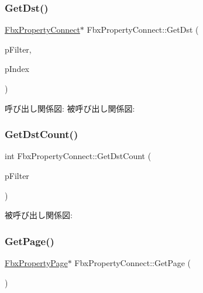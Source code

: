 \mbox{\label{class_fbx_property_connect_a69c1a55bfdeeb234e4ab2f344ac8d70f}} 
\subsubsection{\texorpdfstring{Get\+Dst()}{GetDst()}}
{\footnotesize\ttfamily \hyperlink{class_fbx_property_connect}{Fbx\+Property\+Connect}$\ast$ Fbx\+Property\+Connect\+::\+Get\+Dst (\begin{DoxyParamCaption}\item[{\hyperlink{class_fbx_connection_point_filter}{Fbx\+Connection\+Point\+Filter} $\ast$}]{p\+Filter,  }\item[{int}]{p\+Index }\end{DoxyParamCaption})}

呼び出し関係図\+:
被呼び出し関係図\+:
\mbox{\label{class_fbx_property_connect_ab113f35b3c1ec46e432d2214585d28aa}} 
\subsubsection{\texorpdfstring{Get\+Dst\+Count()}{GetDstCount()}}
{\footnotesize\ttfamily int Fbx\+Property\+Connect\+::\+Get\+Dst\+Count (\begin{DoxyParamCaption}\item[{\hyperlink{class_fbx_connection_point_filter}{Fbx\+Connection\+Point\+Filter} $\ast$}]{p\+Filter }\end{DoxyParamCaption})}

被呼び出し関係図\+:
\mbox{\label{class_fbx_property_connect_a738445f2445642878f28886d95e107e9}} 
\subsubsection{\texorpdfstring{Get\+Page()}{GetPage()}}
{\footnotesize\ttfamily \hyperlink{class_fbx_property_page}{Fbx\+Property\+Page}$\ast$ Fbx\+Property\+Connect\+::\+Get\+Page (\begin{DoxyParamCaption}{ }\end{DoxyParamCaption})}

